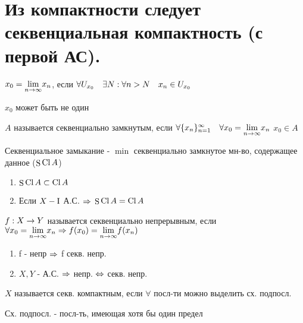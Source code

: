 \documentclass[geometry.tex]{subfiles}
\begin{document}
  \section{Из компактности следует секвенциальная компактность (с первой АС).}

  \begin{definition}
      $x_0 = \underset{n \rightarrow \infty}{\lim} x_n$, если $\forall U_{x_0} \quad \exists N: \forall n > N \quad x_n \in U_{x_0}$
  \end{definition}

  \begin{remark}
    $x_0$ может быть не один
  \end{remark}

  \begin{definition}
      $A$ называется секвенциально замкнутым, если $\forall \{x_n\}_{n=1}^{\infty} \quad \forall x_0 = \underset{n \rightarrow \infty}{\lim} x_n$ $x_0 \in A$
  \end{definition}

  \begin{definition}
      Секвенциальное замыкание - $\min$ секвенциально замкнутое мн-во, содержащее данное  ($\mathop{\rm S}\nolimits\mathop{\rm Cl}\nolimits A$)
  \end{definition}

  \begin{theorem}[б/д]
      \begin{enumerate}
          \item $\mathop{\rm S}\nolimits\mathop{\rm Cl}\nolimits A \subset \mathop{\rm Cl}\nolimits A$
          \item Если $X - \RNumb{1}$ А.С. $\Rightarrow$ $\mathop{\rm S}\nolimits\mathop{\rm Cl}\nolimits A = \mathop{\rm Cl}\nolimits A$
      \end{enumerate}
  \end{theorem}

  \begin{definition}
      $f: X \rightarrow Y$ называется секвенциально непрерывным, если $\forall x_0 = \underset{n \rightarrow \infty}{\lim} x_n \Rightarrow f(x_0) = \underset{n \rightarrow \infty}{\lim}  f(x_n)$
  \end{definition}

  \begin{theorem}
      \begin{enumerate}
          \item f - непр $\Rightarrow$ f секв. непр.
          \item $X,Y$ -  А.С. $\Rightarrow$ непр. $\Leftrightarrow$ секв. непр.
      \end{enumerate}
  \end{theorem}

  \begin{definition}
      $X$ называется секв. компактным, если $\forall$ посл-ти можно выделить сх. подпосл.

      Сх. подпосл. - посл-ть, имеющая хотя бы один предел
  \end{definition}
\end{document}
